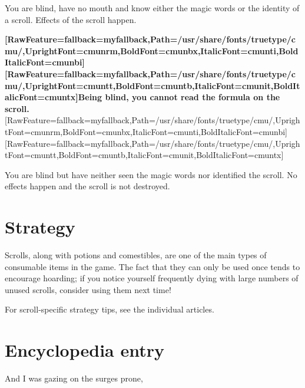 \begin{myquote}
\item{}You are blind, have no mouth and know either the magic words or the identity of a scroll. Effects of the scroll happen.
\end{myquote}

{\bfseries \allowbreak{}\setmainfont{cmunbx.ttf}[RawFeature={fallback=myfallback},Path=/usr/share/fonts/truetype/cmu/,UprightFont=cmunrm,BoldFont=cmunbx,ItalicFont=cmunti,BoldItalicFont=cmunbi]\setmonofont{cmunbx.ttf}[RawFeature={fallback=myfallback},Path=/usr/share/fonts/truetype/cmu/,UprightFont=cmuntt,BoldFont=cmuntb,ItalicFont=cmunit,BoldItalicFont=cmuntx]\bfseries Being blind, you cannot read the formula on the scroll.}\allowbreak{}\setmainfont{cmunrm.ttf}[RawFeature={fallback=myfallback},Path=/usr/share/fonts/truetype/cmu/,UprightFont=cmunrm,BoldFont=cmunbx,ItalicFont=cmunti,BoldItalicFont=cmunbi]\setmonofont{cmunrm.ttf}[RawFeature={fallback=myfallback},Path=/usr/share/fonts/truetype/cmu/,UprightFont=cmuntt,BoldFont=cmuntb,ItalicFont=cmunit,BoldItalicFont=cmuntx]

\begin{myquote}
\item{}You are blind but have neither seen the magic words nor identified the scroll. No effects happen and the scroll is not destroyed.
\end{myquote}

\section{Strategy}
\label{16}
Scrolls, along with potions\footnotemark[108] and comestibles\footnotemark[109], are one of the main types of consumable items in the game. The fact that they can only be used once tends to encourage hoarding; if you notice yourself frequently dying with large numbers of unused scrolls, consider using them next time!


For scroll-{}specific strategy tips, see the individual articles.



\section{Encyclopedia entry}
\label{17}

And I was gazing on the surges prone,$\text{ }$\newline{}

